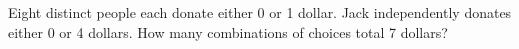 Eight distinct people each donate either 0 or 1 dollar. Jack independently donates either 0 or 4 dollars. How many combinations of choices total 7 dollars?
